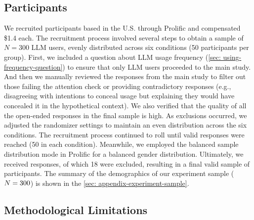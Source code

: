 \subsection{Participants}
We recruited participants based in the U.S. through Prolific and compensated \$1.4 each. 
The recruitment process involved several steps to obtain a sample of $N=300$ LLM users, evenly distributed across six conditions (50 participants per group).
First, we included a question about LLM usage frequency (\autoref{sec: using-frequency-question}) to ensure that only LLM users proceeded to the main study.
And then we manually reviewed the responses from the main study to filter out those failing the attention check or providing contradictory responses (e.g., disagreeing with intentions to conceal usage but explaining they would have concealed it in the hypothetical context).
We also verified that the quality of all the open-ended responses in the final sample is high.
As exclusions occurred, we adjusted the randomizer settings to maintain an even distribution across the six conditions.
The recruitment process continued to roll until \experimentvalidsamplesize{} valid responses were reached (50 in each condition).
Meanwhile, we employed the balanced sample distribution mode in Prolific for a balanced gender distribution.
Ultimately, we received \experimentrawdatapoint{} responses, of which 18 were excluded, resulting in a final valid sample of \experimentvalidsamplesize{} participants.
The summary of the demographics of our experiment sample ($N = 300{}$) is shown in the \autoref{sec: appendix-experiment-sample}.

\subsection{Methodological Limitations}

